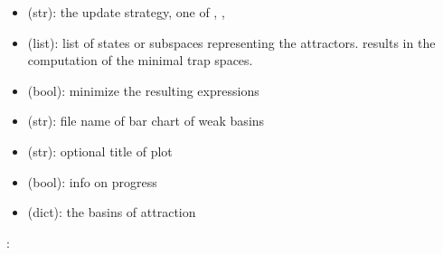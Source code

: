 \documentclass[letterpaper,10pt,english]{sphinxmanual}
\begin{document}
\begin{fulllineitems}
\begin{description}
\begin{itemize}
\item {} 
 (str): the update strategy, one of , , 

\item {} 
 (list): list of states or subspaces representing the attractors.  results in the computation of the minimal trap spaces.

\item {} 
 (bool): minimize the resulting expressions

\item {} 
 (str): file name of bar chart of weak basins

\item {} 
 (str): optional title of plot

\item {} 
 (bool): info on progress

\end{itemize}

\item[{\sphinxstylestrong{returns}::}] \leavevmode\begin{itemize}
\item {} 
 (dict): the basins of attraction

\end{itemize}

\end{description}

:

\begin{sphinxVerbatim}[commandchars=\\\{\}]
  
 
\end{sphinxVerbatim}

\end{fulllineitems}
\end{document}
